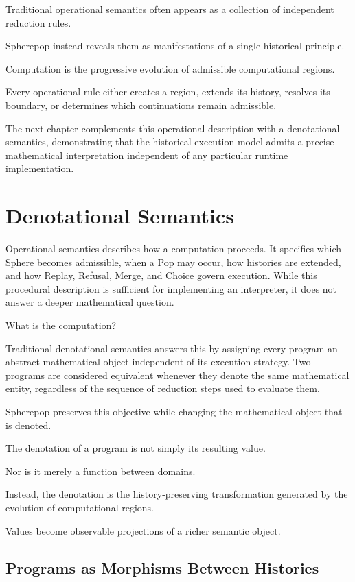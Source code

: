 \documentclass[12pt,oneside]{article}
\theoremstyle{definition}
\theoremstyle{remark}
\begin{document}
Traditional operational semantics often appears as a collection of independent
reduction rules.

Spherepop instead reveals them as manifestations of a single historical
principle.

Computation is the progressive evolution of admissible computational regions.

Every operational rule either creates a region, extends its history, resolves
its boundary, or determines which continuations remain admissible.

The next chapter complements this operational description with a denotational
semantics, demonstrating that the historical execution model admits a precise
mathematical interpretation independent of any particular runtime
implementation.

\section{Denotational Semantics}

Operational semantics describes how a computation proceeds. It specifies which
Sphere becomes admissible, when a Pop may occur, how histories are extended,
and how Replay, Refusal, Merge, and Choice govern execution. While this
procedural description is sufficient for implementing an interpreter, it does
not answer a deeper mathematical question.

What is the computation?

Traditional denotational semantics answers this by assigning every program an
abstract mathematical object independent of its execution strategy. Two
programs are considered equivalent whenever they denote the same mathematical
entity, regardless of the sequence of reduction steps used to evaluate them.

Spherepop preserves this objective while changing the mathematical object that
is denoted.

The denotation of a program is not simply its resulting value.

Nor is it merely a function between domains.

Instead, the denotation is the history-preserving transformation generated by
the evolution of computational regions.

Values become observable projections of a richer semantic object.

\subsection{Programs as Morphisms Between Histories}
\end{document}
